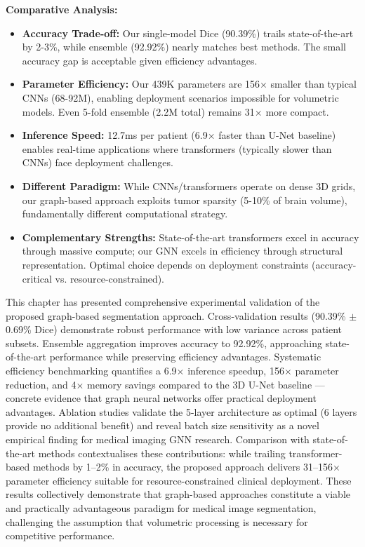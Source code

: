 \textbf{Comparative Analysis:}

\begin{itemize}
    \item \textbf{Accuracy Trade-off:} Our single-model Dice (90.39\%) trails state-of-the-art by 2-3\%, while ensemble (92.92\%) nearly matches best methods. The small accuracy gap is acceptable given efficiency advantages.
    
    \item \textbf{Parameter Efficiency:} Our 439K parameters are 156$\times$ smaller than typical CNNs (68-92M), enabling deployment scenarios impossible for volumetric models. Even 5-fold ensemble (2.2M total) remains 31$\times$ more compact.
    
    \item \textbf{Inference Speed:} 12.7ms per patient (6.9$\times$ faster than U-Net baseline) enables real-time applications where transformers (typically slower than CNNs) face deployment challenges.
    
    \item \textbf{Different Paradigm:} While CNNs/transformers operate on dense 3D grids, our graph-based approach exploits tumor sparsity (5-10\% of brain volume), fundamentally different computational strategy.
    
    \item \textbf{Complementary Strengths:} State-of-the-art transformers excel in accuracy through massive compute; our GNN excels in efficiency through structural representation. Optimal choice depends on deployment constraints (accuracy-critical vs. resource-constrained).
\end{itemize}

\vspace{5mm}

This chapter has presented comprehensive experimental validation of the proposed graph-based segmentation approach. Cross-validation results (90.39\% $\pm$ 0.69\% Dice) demonstrate robust performance with low variance across patient subsets. Ensemble aggregation improves accuracy to 92.92\%, approaching state-of-the-art performance while preserving efficiency advantages. Systematic efficiency benchmarking quantifies a 6.9$\times$ inference speedup, 156$\times$ parameter reduction, and 4$\times$ memory savings compared to the 3D U-Net baseline — concrete evidence that graph neural networks offer practical deployment advantages. Ablation studies validate the 5-layer architecture as optimal (6 layers provide no additional benefit) and reveal batch size sensitivity as a novel empirical finding for medical imaging GNN research. Comparison with state-of-the-art methods contextualises these contributions: while trailing transformer-based methods by 1--2\% in accuracy, the proposed approach delivers 31--156$\times$ parameter efficiency suitable for resource-constrained clinical deployment. These results collectively demonstrate that graph-based approaches constitute a viable and practically advantageous paradigm for medical image segmentation, challenging the assumption that volumetric processing is necessary for competitive performance.

\clearpage